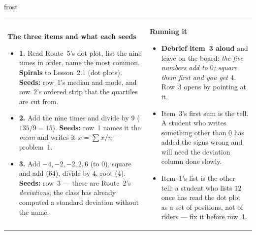 \documentclass[10pt]{article}
\begin{document}
\begin{fixedskillbox}{frost}
\begin{tabularx}{\linewidth}{@{}X X@{}}
\begin{minipage}[t]{\linewidth}\vspace{0pt}
    \textbf{The three items and what each seeds}
    \begin{itemize}[leftmargin=1.1em, itemsep=1pt, topsep=2pt]
      \item \textbf{1.} Read Route~5's dot plot, list the nine times in order, name the most
            common. \textbf{Spirals} to Lesson~2.1 (dot plots). \textbf{Seeds:} row~1's median
            and mode, and row~2's ordered strip that the quartiles are cut from.
      \item \textbf{2.} Add the nine times and divide by $9$ ($135/9 = 15$). \textbf{Seeds:}
            row~1 names it the \emph{mean} and writes it $\bar{x} = \sum x / n$ --- problem~1.
      \item \textbf{3.} Add $-4, -2, -2, 2, 6$ (to $0$), square and add ($64$), divide by $4$,
            root ($4$). \textbf{Seeds:} row~3 --- these are Route~2's \emph{deviations}; the
            class has already computed a standard deviation without the name.
    \end{itemize}
\end{minipage}
&
\begin{minipage}[t]{\linewidth}\vspace{0pt}
    \textbf{Running it}
    \begin{itemize}[leftmargin=1.1em, itemsep=1pt, topsep=2pt]
      \item \textbf{Debrief item~3 aloud} and leave on the board: \emph{the five numbers add to
            $0$; square them first and you get $4$.} Row~3 opens by pointing at it.
      \item Item~3's first sum is the tell. A student who writes something other than $0$
            has added the signs wrong and will need the deviation column done slowly.
      \item Item~1's list is the other tell: a student who lists $12$ once has read the dot
            plot as a set of positions, not of riders --- fix it before row~1.
    \end{itemize}
\end{minipage}
\end{tabularx}
\end{fixedskillbox}
\end{document}
